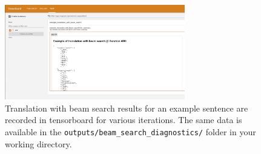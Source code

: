 \begin{parts}
\begin{subparts}
    \end{subparts}



    \begin{figure}
        \centering
        \includegraphics[width=0.7\textwidth]{images/example_translation_beam.jpg}
        \caption{Translation with beam search results for an example sentence are recorded in tensorboard for various iterations. The same data is available in the \texttt{outputs/beam\_search\_diagnostics/} folder in your working directory.}
        \label{fig:beam-search-diagnostics-tensorboard}
    \end{figure}
    

\end{parts}

